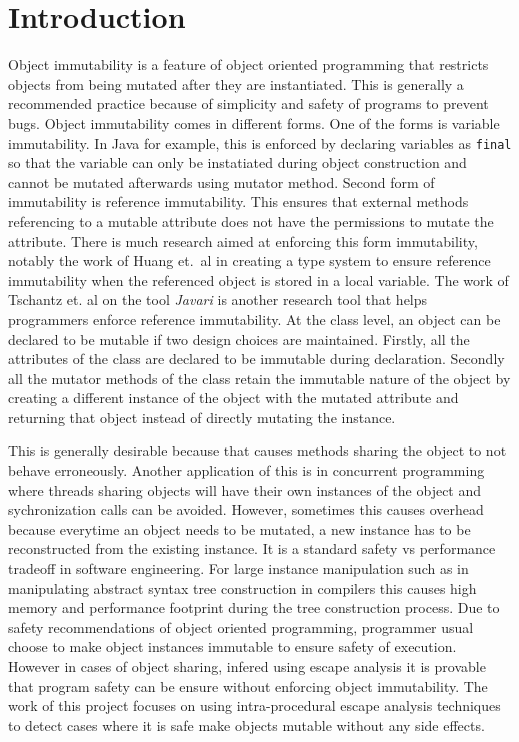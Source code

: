 \section{Introduction}
Object immutability is a feature of object oriented programming that restricts objects from being mutated after they are instantiated. This is generally a recommended practice because of simplicity and safety of programs to prevent bugs. Object immutability comes in different forms. One of the forms is variable immutability. In Java for example, this is enforced by declaring variables as \texttt{final} so that the variable can only be instatiated during object construction and cannot be mutated afterwards using mutator method. Second form of immutability is reference immutability. This ensures that external methods referencing to a mutable attribute does not have the permissions to mutate the attribute. There is much research aimed at enforcing this form immutability, notably the work of Huang et.\ al \citep{ref:ReIm} in creating a type system to ensure reference immutability when the referenced object is stored in a local variable. The work of Tschantz et. al on the tool \textit{Javari} \cite{ref:javari} is another research tool that helps programmers enforce reference immutability. At the class level, an object can be declared to be mutable if two design choices are maintained. Firstly, all the attributes of the class are declared to be immutable during declaration. Secondly all the mutator methods of the class retain the immutable nature of the object by creating a different instance of the object with the mutated attribute and returning that object instead of directly mutating the instance. 

This is generally desirable because that causes methods sharing the object to not behave erroneously. Another application of this is in concurrent programming where threads sharing objects will have their own instances of the object and sychronization calls can be avoided. However, sometimes this causes overhead because everytime an object needs to be mutated, a new instance has to be reconstructed from the existing instance. It is a standard safety vs performance tradeoff in software engineering. For large instance manipulation such as in manipulating abstract syntax tree construction in compilers this causes high memory and performance footprint during the tree construction process. Due to safety recommendations of object oriented programming, programmer usual choose to make object instances immutable to ensure safety of execution. However in cases of object sharing, infered using escape analysis \citep{ref:compositionalEscape}\cite{ref:escapejava}\cite{ref:incrementalescape} it is provable that program safety can be ensure without enforcing object immutability. The work of this project focuses on using intra-procedural escape analysis techniques \cite{ref:globalescape} to detect cases where it is safe make objects mutable without any side effects.

